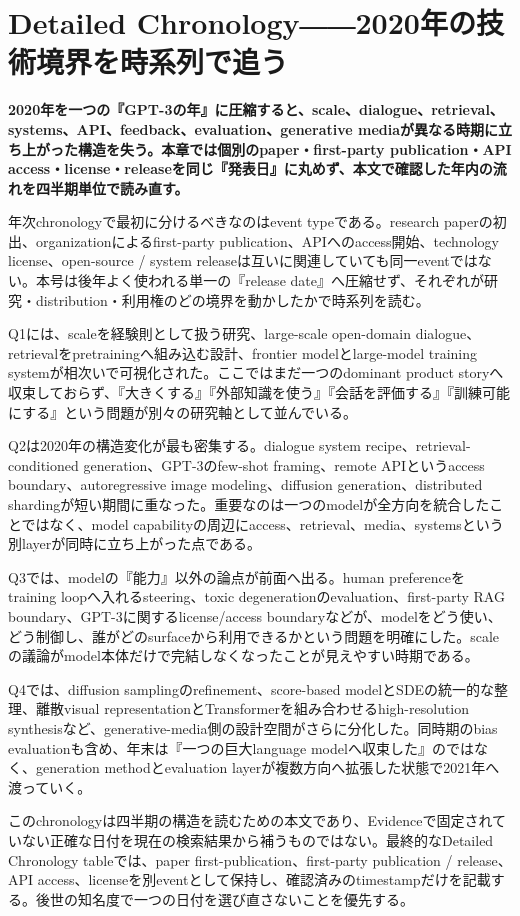\section{Detailed Chronology――2020年の技術境界を時系列で追う}
\noindent\textbf{2020年を一つの『GPT-3の年』に圧縮すると、scale、dialogue、retrieval、systems、API、feedback、evaluation、generative mediaが異なる時期に立ち上がった構造を失う。本章では個別のpaper・first-party publication・API access・license・releaseを同じ『発表日』に丸めず、本文で確認した年内の流れを四半期単位で読み直す。}

年次chronologyで最初に分けるべきなのはevent typeである。research paperの初出、organizationによるfirst-party publication、APIへのaccess開始、technology license、open-source / system releaseは互いに関連していても同一eventではない。本号は後年よく使われる単一の『release date』へ圧縮せず、それぞれが研究・distribution・利用権のどの境界を動かしたかで時系列を読む。


Q1には、scaleを経験則として扱う研究、large-scale open-domain dialogue、retrievalをpretrainingへ組み込む設計、frontier modelとlarge-model training systemが相次いで可視化された。ここではまだ一つのdominant product storyへ収束しておらず、『大きくする』『外部知識を使う』『会話を評価する』『訓練可能にする』という問題が別々の研究軸として並んでいる。


Q2は2020年の構造変化が最も密集する。dialogue system recipe、retrieval-conditioned generation、GPT-3のfew-shot framing、remote APIというaccess boundary、autoregressive image modeling、diffusion generation、distributed shardingが短い期間に重なった。重要なのは一つのmodelが全方向を統合したことではなく、model capabilityの周辺にaccess、retrieval、media、systemsという別layerが同時に立ち上がった点である。


Q3では、modelの『能力』以外の論点が前面へ出る。human preferenceをtraining loopへ入れるsteering、toxic degenerationのevaluation、first-party RAG boundary、GPT-3に関するlicense/access boundaryなどが、modelをどう使い、どう制御し、誰がどのsurfaceから利用できるかという問題を明確にした。scaleの議論がmodel本体だけで完結しなくなったことが見えやすい時期である。


Q4では、diffusion samplingのrefinement、score-based modelとSDEの統一的な整理、離散visual representationとTransformerを組み合わせるhigh-resolution synthesisなど、generative-media側の設計空間がさらに分化した。同時期のbias evaluationも含め、年末は『一つの巨大language modelへ収束した』のではなく、generation methodとevaluation layerが複数方向へ拡張した状態で2021年へ渡っていく。


このchronologyは四半期の構造を読むための本文であり、Evidenceで固定されていない正確な日付を現在の検索結果から補うものではない。最終的なDetailed Chronology tableでは、paper first-publication、first-party publication / release、API access、licenseを別eventとして保持し、確認済みのtimestampだけを記載する。後世の知名度で一つの日付を選び直さないことを優先する。

